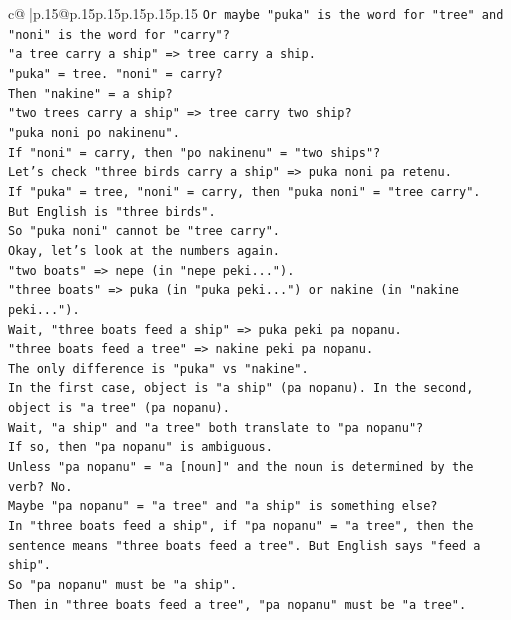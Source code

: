 \documentclass{article}
\begin{document}
{\begin{supertabular}{c@{$\;$}|p{.15\linewidth}@{}p{.15\linewidth}p{.15\linewidth}p{.15\linewidth}p{.15\linewidth}p{.15\linewidth}}
{{{\texttt{Or maybe "puka" is the word for "tree" and "noni" is the word for "carry"?} \\
\texttt{"a tree carry a ship" => tree carry a ship.} \\
\texttt{"puka" = tree. "noni" = carry?} \\
\texttt{Then "nakine" = a ship?} \\
\texttt{"two trees carry a ship" => tree carry two ship?} \\
\texttt{"puka noni po nakinenu".} \\
\texttt{If "noni" = carry, then "po nakinenu" = "two ships"?} \\
\texttt{Let's check "three birds carry a ship" => puka noni pa retenu.} \\
\texttt{If "puka" = tree, "noni" = carry, then "puka noni" = "tree carry".} \\
\texttt{But English is "three birds".} \\
\texttt{So "puka noni" cannot be "tree carry".} \\
\texttt{Okay, let's look at the numbers again.} \\
\texttt{"two boats" => nepe (in "nepe peki...").} \\
\texttt{"three boats" => puka (in "puka peki...") or nakine (in "nakine peki...").} \\
\texttt{Wait, "three boats feed a ship" => puka peki pa nopanu.} \\
\texttt{"three boats feed a tree" => nakine peki pa nopanu.} \\
\texttt{The only difference is "puka" vs "nakine".} \\
\texttt{In the first case, object is "a ship" (pa nopanu). In the second, object is "a tree" (pa nopanu).} \\
\texttt{Wait, "a ship" and "a tree" both translate to "pa nopanu"?} \\
\texttt{If so, then "pa nopanu" is ambiguous.} \\
\texttt{Unless "pa nopanu" = "a {[}noun{]}" and the noun is determined by the verb? No.} \\
\texttt{Maybe "pa nopanu" = "a tree" and "a ship" is something else?} \\
\texttt{In "three boats feed a ship", if "pa nopanu" = "a tree", then the sentence means "three boats feed a tree". But English says "feed a ship".} \\
\texttt{So "pa nopanu" must be "a ship".} \\
\texttt{Then in "three boats feed a tree", "pa nopanu" must be "a tree".} \\
}}}
\end{supertabular}}
\end{document}

